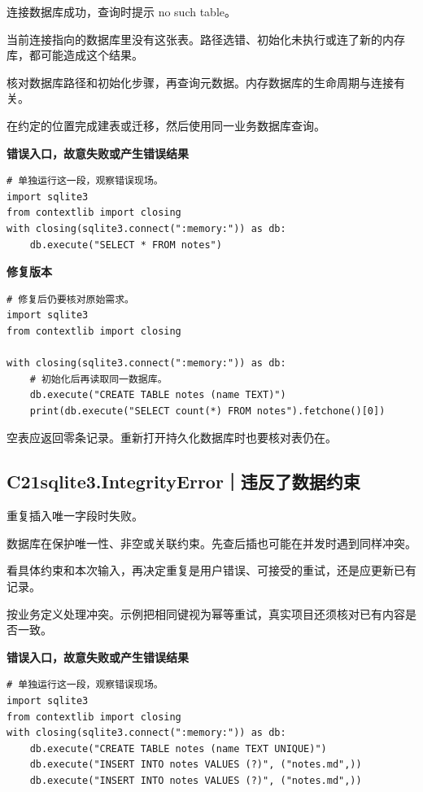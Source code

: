 \documentclass[UTF8,a4paper,oneside,openany,fontset=none,11pt]{ctexbook}
\newcommand{\code}[1]{\texttt{\detokenize{#1}}}
\newcommand{\CaseStep}[2]{\par\smallskip{\bfseries\color{Muted}#1}\enspace #2\par}
\begin{document}
\CaseStep{现象}{连接数据库成功，查询时提示 no such table。}

\CaseStep{原因}{当前连接指向的数据库里没有这张表。路径选错、初始化未执行或连了新的内存库，都可能造成这个结果。}

\CaseStep{排查}{核对数据库路径和初始化步骤，再查询元数据。内存数据库的生命周期与连接有关。}

\CaseStep{修复}{在约定的位置完成建表或迁移，然后使用同一业务数据库查询。}

\textbf{错误入口，故意失败或产生错误结果}

\begin{lstlisting}[style=errorcode,title={错误复现（故意失败或错误结果）：\code{case_20_bad.py.txt}}]
# 单独运行这一段，观察错误现场。
import sqlite3
from contextlib import closing
with closing(sqlite3.connect(":memory:")) as db:
    db.execute("SELECT * FROM notes")
\end{lstlisting}

\textbf{修复版本}

\begin{lstlisting}[title={\code{case_20.py}}]
# 修复后仍要核对原始需求。
import sqlite3
from contextlib import closing

with closing(sqlite3.connect(":memory:")) as db:
    # 初始化后再读取同一数据库。
    db.execute("CREATE TABLE notes (name TEXT)")
    print(db.execute("SELECT count(*) FROM notes").fetchone()[0])
\end{lstlisting}

\CaseStep{复验}{空表应返回零条记录。重新打开持久化数据库时也要核对表仍在。}

\subsection*{C21\enspace sqlite3.IntegrityError｜违反了数据约束}

\CaseStep{现象}{重复插入唯一字段时失败。}

\CaseStep{原因}{数据库在保护唯一性、非空或关联约束。先查后插也可能在并发时遇到同样冲突。}

\CaseStep{排查}{看具体约束和本次输入，再决定重复是用户错误、可接受的重试，还是应更新已有记录。}

\CaseStep{修复}{按业务定义处理冲突。示例把相同键视为幂等重试，真实项目还须核对已有内容是否一致。}

\textbf{错误入口，故意失败或产生错误结果}

\begin{lstlisting}[style=errorcode,title={错误复现（故意失败或错误结果）：\code{case_21_bad.py.txt}}]
# 单独运行这一段，观察错误现场。
import sqlite3
from contextlib import closing
with closing(sqlite3.connect(":memory:")) as db:
    db.execute("CREATE TABLE notes (name TEXT UNIQUE)")
    db.execute("INSERT INTO notes VALUES (?)", ("notes.md",))
    db.execute("INSERT INTO notes VALUES (?)", ("notes.md",))
\end{lstlisting}
\end{document}
